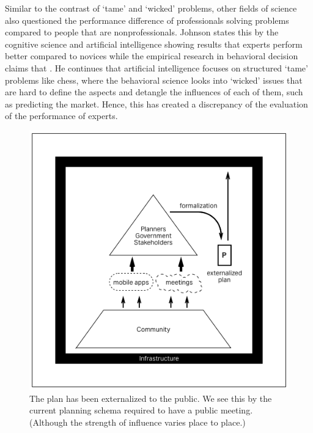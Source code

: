 Similar to the contrast of `tame' and `wicked' problems, other fields of science also questioned the performance difference of professionals solving problems compared to people that are nonprofessionals. Johnson states this by the cognitive science and artificial intelligence showing results that experts perform better compared to novices while the empirical research in behavioral decision claims that . \cite{chi2014nature} He continues that artificial intelligence focuses on structured `tame' problems like chess, where the behavioral science looks into `wicked' issues that are hard to define the aspects and detangle the influences of each of them, such as predicting the market. Hence, this has created a discrepancy of the evaluation of the performance of experts. 
\cite{armstrong1978longrange}  

\begin{figure}[htb]
  \includegraphics[width=\textwidth]{chapters/2/fig/externalized_plan.png}               
  \caption[diagram: externalized plan]{The plan has been externalized to the public. We see this by the current planning schema required to have a public meeting. (Although the strength of influence varies place to place.)}
  \label{fig:externalized_plan}
\end{figure}

